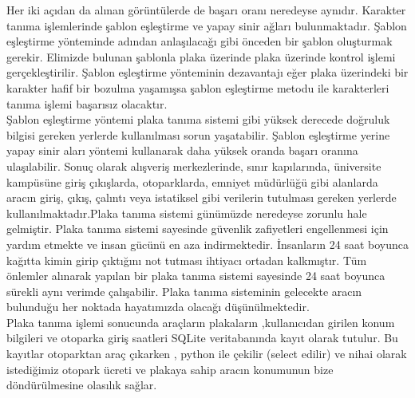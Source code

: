 Her iki açıdan da alınan görüntülerde de başarı oranı neredeyse aynıdır. \cite{detection} Karakter tanıma işlemlerinde şablon eşleştirme ve yapay sinir ağları bulunmaktadır. Şablon eşleştirme yönteminde adından anlaşılacağı gibi önceden bir şablon oluşturmak gerekir. Elimizde bulunan şablonla plaka üzerinde plaka üzerinde kontrol işlemi gerçekleştirilir. Şablon eşleştirme yönteminin dezavantajı eğer plaka üzerindeki bir karakter hafif bir bozulma yaşamışsa şablon eşleştirme metodu ile karakterleri tanıma işlemi başarısız olacaktır. \\
\cite{segmentation} Şablon eşleştirme yöntemi plaka tanıma sistemi gibi yüksek derecede doğruluk bilgisi gereken yerlerde kullanılması sorun yaşatabilir. Şablon eşleştirme yerine yapay sinir aları yöntemi kullanarak daha yüksek oranda başarı oranına ulaşılabilir. Sonuç olarak alışveriş merkezlerinde, sınır kapılarında, üniversite kampüsüne giriş çıkışlarda, otoparklarda, emniyet müdürlüğü gibi alanlarda aracın giriş, çıkış, çalıntı veya istatiksel gibi verilerin tutulması gereken yerlerde kullanılmaktadır.Plaka tanıma sistemi günümüzde neredeyse zorunlu hale gelmiştir. Plaka tanıma sistemi sayesinde güvenlik zafiyetleri engellenmesi için yardım etmekte ve insan gücünü en aza indirmektedir. İnsanların 24 saat boyunca kağıtta kimin girip çıktığını not tutması ihtiyacı ortadan kalkmıştır. Tüm önlemler alınarak yapılan bir plaka tanıma sistemi sayesinde 24 saat boyunca sürekli aynı verimde çalışabilir. Plaka tanıma sisteminin gelecekte aracın bulunduğu her noktada hayatımızda olacağı düşünülmektedir. \\
Plaka tanıma işlemi sonucunda araçların plakaların ,kullanıcıdan girilen konum bilgileri ve otoparka giriş saatleri SQLite veritabanında kayıt olarak tutulur. Bu kayıtlar otoparktan araç çıkarken , python ile çekilir (select edilir) ve nihai olarak istediğimiz otopark ücreti ve plakaya sahip aracın konumunun bize döndürülmesine olasılık sağlar.


